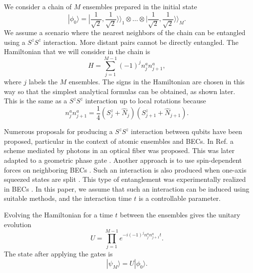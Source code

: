 \documentclass[12pt]{iopart}
\begin{document}

We consider a chain of $ M $ ensembles prepared in the initial state
%
%
\begin{equation}
|\phi_0 \rangle=|\frac{1}{\sqrt{2}},\frac{1}{\sqrt{2}}\rangle\rangle_{1}\otimes\dots\otimes|\frac{1}{\sqrt{2}},\frac{1}{\sqrt{2}}\rangle\rangle_{M} .  \label{initstate}
\end{equation}
%
We assume a scenario where the nearest neighbors of the chain can be entangled using a $ S^z S^z $  interaction. More distant pairs cannot be directly entangled.  The Hamiltonian that we will consider in the chain is
%
\begin{equation}
H=  \sum_{j=1}^{M-1} (-1)^j n_j^a n_{j+1}^a , 
\label{mainham}
\end{equation}
%
where $ j$ labels the  $M $ ensembles. The signs in the Hamiltonian are chosen in this way so that the simplest analytical formulas can be obtained, as shown later.  
 This is the same as a $ S^z S^z $ interaction up to local rotations because
%
\begin{equation}
n^a_j n_{j+1}^a = \frac{1}{4} (S^z_j + \hat{N}_j) (S^z_{j+1} + \hat{N}_{j+1} ).  
\end{equation}

Numerous proposals for producing a $ S^z S^z $ interaction between qubits have been proposed, particular in the context of atomic ensembles and BECs.  In Ref. \cite{pyrkov2013entanglement} a scheme mediated by photons in an optical fiber was proposed.  This was later adapted to a geometric phase gate \cite{hussain2014geometric}. Another approach is to use spin-dependent forces on neighboring BECs \cite{treutlein2006}.  
Such an interaction is also produced when one-axis squeezed states are split \cite{Jing_2019}.  This type of entanglement was  experimentally realized in BECs \cite{fadel2018spatial,Colciaghi2023}.  In this paper, we assume that such an interaction can be induced using suitable methods, and the interaction time $ t $ is a controllable parameter. 

Evolving the Hamiltonian for a time $ t $ between the ensembles gives the unitary evolution
%
\begin{equation}
U=\prod^{M-1}_{j=1} e^{- i (-1)^j  n^a_j n^a_{j+1} t} . 
\end{equation}
%
The state after applying the gates is
%
\begin{equation}
|\psi_M \rangle = U | \phi_0 \rangle . 
\end{equation}
\end{document}
